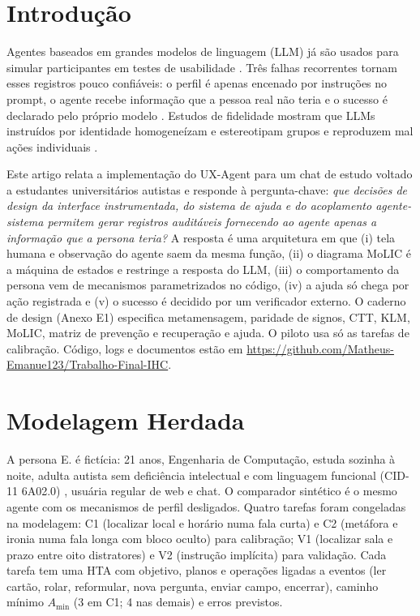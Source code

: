 \section{Introdução}
Agentes baseados em grandes modelos de linguagem (LLM) já são usados para simular participantes em testes de usabilidade \cite{lu2025uxagent}. Três falhas recorrentes tornam esses registros pouco confiáveis: o perfil é apenas encenado por instruções no prompt, o agente recebe informação que a pessoa real não teria e o sucesso é declarado pelo próprio modelo \cite{lara2026p3}. Estudos de fidelidade mostram que LLMs instruídos por identidade homogeneízam e estereotipam grupos \cite{wang2025,park2025} e reproduzem mal ações individuais \cite{lu2026}.

Este artigo relata a implementação do UX-Agent para um chat de estudo voltado a estudantes universitários autistas e responde à pergunta-chave: \emph{que decisões de design da interface instrumentada, do sistema de ajuda e do acoplamento agente-sistema permitem gerar registros auditáveis fornecendo ao agente apenas a informação que a persona teria?} A resposta é uma arquitetura em que (i) tela humana e observação do agente saem da mesma função, (ii) o diagrama MoLIC é a máquina de estados e restringe a resposta do LLM, (iii) o comportamento da persona vem de mecanismos parametrizados no código, (iv) a ajuda só chega por ação registrada e (v) o sucesso é decidido por um verificador externo. O caderno de design (Anexo E1) especifica metamensagem, paridade de signos, CTT, KLM, MoLIC, matriz de prevenção e recuperação e ajuda. O piloto usa só as tarefas de calibração. Código, logs e documentos estão em \url{https://github.com/Matheus-Emanue123/Trabalho-Final-IHC}.

\section{Modelagem Herdada}
A persona E. é fictícia: 21 anos, Engenharia de Computação, estuda sozinha à noite, adulta autista sem deficiência intelectual e com linguagem funcional (CID-11 6A02.0) \cite{who2024}, usuária regular de web e chat. O comparador sintético é o mesmo agente com os mecanismos de perfil desligados. Quatro tarefas foram congeladas na modelagem: C1 (localizar local e horário numa fala curta) e C2 (metáfora e ironia numa fala longa com bloco oculto) para calibração; V1 (localizar sala e prazo entre oito distratores) e V2 (instrução implícita) para validação. Cada tarefa tem uma HTA \cite{annett1967} com objetivo, planos e operações ligadas a eventos (ler cartão, rolar, reformular, nova pergunta, enviar campo, encerrar), caminho mínimo $A_{\min}$ (3 em C1; 4 nas demais) e erros previstos.

